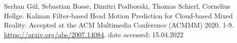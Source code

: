 \begin{thebibliography}{99}

Serhan Gül, Sebastian Bosse, Dimitri Podborski, Thomas Schierl, Cornelius Hellge. Kalman Filter-based Head Motion Prediction for Cloud-based Mixed Reality. Accepted at the ACM Multimedia Conference (ACMMM) 2020. 1-9. \url{https://arxiv.org/abs/2007.14084}. date accessed: 15.04.2022

\end{thebibliography}